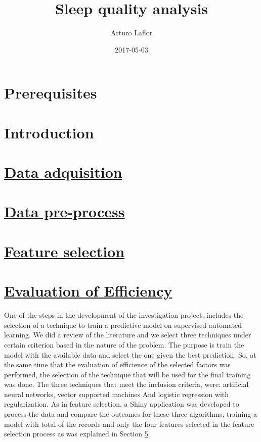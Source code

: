 \documentclass[]{book}
\title{Sleep quality analysis}
\author{Arturo Laflor}
\date{2017-05-03}
\begin{document}
\maketitle

{
\setcounter{tocdepth}{1}
\tableofcontents
}
\chapter{Prerequisites}\label{prerequisites}

\chapter{Introduction}\label{intro}

\hypertarget{data-adquisition}{\chapter{\texorpdfstring{\protect\hyperlink{data-adquisition}{Data
adquisition}}{Data adquisition}}\label{data-adquisition}}

\chapter{\texorpdfstring{\protect\hyperlink{data-preprocess}{Data
pre-process}}{Data pre-process}}\label{data-pre-process}

\hypertarget{feature-selection}{\chapter{\texorpdfstring{\protect\hyperlink{feature-selection}{Feature
selection}}{Feature selection}}\label{feature-selection}}

\chapter{\texorpdfstring{\protect\hyperlink{efficiency-evaluation}{Evaluation
of
Efficiency}}{Evaluation of Efficiency}}\label{evaluation-of-efficiency}

One of the steps in the development of the investigation project,
includes the selection of a technique to train a predictive model on
supervised automated learning. We did a review of the literature and we
select three techniques under certain criterion based in the nature of
the problem. The purpose is train the model with the available data and
select the one given the best prediction. So, at the same time that the
evaluation of efficience of the selected factors was performed, the
selection of the technique that will be used for the final training was
done. The three techniques that meet the inclusion criteria, were:
artificial neural networks, vector supported machines And logistic
regression with regularization. As in feature selection, a Shiny
application was developed to process the data and compare the outcomes
for these three algorithms, training a model with total of the records
and only the four features selected in the feature selection process as
was explained in Section \ref{feature-selection}.
\end{document}

